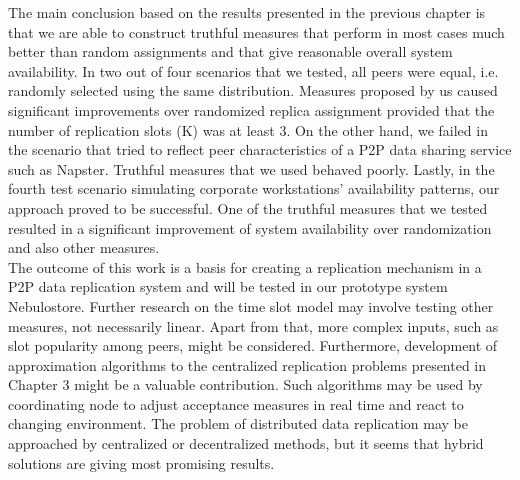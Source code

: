 \documentclass{pracamgren}
\begin{document}
The main conclusion based on the results presented in the previous chapter is that we are able to construct truthful measures that perform in most cases much better than random assignments and that give reasonable overall system availability. In two out of four scenarios that we tested, all peers were equal, i.e. randomly selected using the same distribution. Measures proposed by us caused significant improvements over randomized replica assignment provided that the number of replication slots (K) was at least 3. On the other hand, we failed in the scenario that tried to reflect peer characteristics of a P2P data sharing service such as Napster. Truthful measures that we used behaved poorly. Lastly, in the fourth test scenario simulating corporate workstations' availability patterns, our approach proved to be successful. One of the truthful measures that we tested resulted in a significant improvement of system availability over randomization and also other measures.\\

The outcome of this work is a basis for creating a replication mechanism in a P2P data replication system and will be tested in  our prototype system Nebulostore. Further research on the time slot model may involve testing other measures, not necessarily linear. Apart from that, more complex inputs, such as slot popularity among peers, might be considered. Furthermore, development of approximation algorithms to the centralized replication problems presented in Chapter 3 might be a valuable contribution. Such algorithms may be used by coordinating node to adjust acceptance measures in real time and react to changing environment. The problem of distributed data replication may be approached by centralized or decentralized methods, but it seems that hybrid solutions are giving most promising results.\\

%
%
%
%




\end{document}
